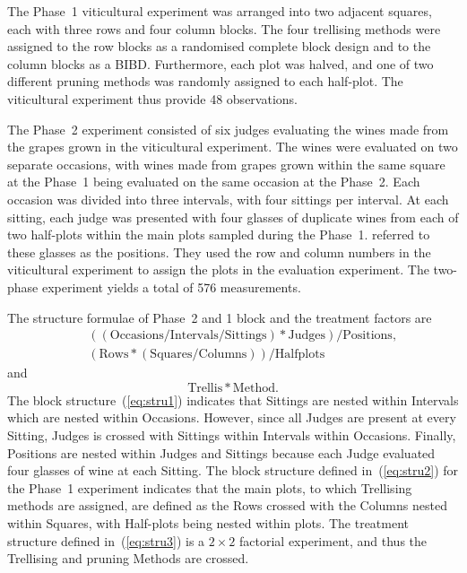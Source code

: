 \documentclass[article]{jss}
\begin{document}
The Phase~1 viticultural experiment was arranged into two adjacent squares, each with three rows and four column blocks. The four trellising methods were assigned to the row blocks as a randomised complete block design and to the column blocks as a BIBD. Furthermore, each plot was halved, and one of two different pruning methods was randomly assigned to each half-plot. The viticultural experiment thus provide 48 observations.

The Phase~2 experiment consisted of six judges evaluating the wines made from the grapes grown in the viticultural experiment. The wines were evaluated on two separate occasions, with wines made from grapes grown within the same square at the Phase~1 being evaluated on the same occasion at the Phase~2. Each occasion was divided into three intervals, with four sittings per interval. At each sitting, each judge was presented with four glasses of duplicate wines from each of two half-plots within the main plots sampled during the Phase~1. \cite{Brien1999} referred to these glasses as the positions. They used the row and column numbers in the viticultural experiment to assign the plots in the evaluation experiment. The two-phase experiment yields a total of 576 measurements.

The structure formulae of Phase~2 and 1 block and the treatment factors are
\begin{eqnarray}
\label{eq:stru1}&&\mathrm{((Occasions/Intervals/Sittings)*Judges)/Positions,}\\
\label{eq:stru2}&&\mathrm{(Rows*(Squares/Columns))/Halfplots}
\end{eqnarray}
and
\begin{equation}\label{eq:stru3}
\mathrm{Trellis*Method.}
\end{equation}
The block structure~(\ref{eq:stru1}) indicates that Sittings are nested within Intervals which are nested within Occasions. However, since all Judges are present at every Sitting, Judges is crossed with Sittings within Intervals within Occasions. Finally, Positions are nested within Judges and Sittings because each Judge evaluated four glasses of wine at each Sitting. The block structure defined in~(\ref{eq:stru2}) for the Phase~1 experiment indicates that the main plots, to which Trellising methods are assigned, are defined as the Rows crossed with the Columns nested within Squares, with Half-plots being nested within plots. The treatment structure defined in~(\ref{eq:stru3}) is a $2 \times 2$ factorial experiment, and thus the Trellising and pruning Methods are crossed.
\end{document}
